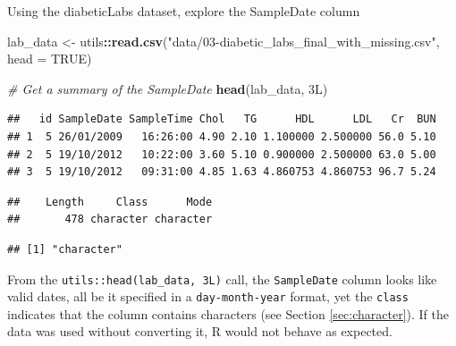 \documentclass[
]{book}
\newenvironment{Shaded}{\begin{snugshade}}{\end{snugshade}}
\newcommand{\AttributeTok}[1]{\textcolor[rgb]{0.13,0.29,0.53}{#1}}
\newcommand{\CommentTok}[1]{\textcolor[rgb]{0.56,0.35,0.01}{\textit{#1}}}
\newcommand{\ConstantTok}[1]{\textcolor[rgb]{0.56,0.35,0.01}{#1}}
\newcommand{\DataTypeTok}[1]{\textcolor[rgb]{0.13,0.29,0.53}{#1}}
\newcommand{\DecValTok}[1]{\textcolor[rgb]{0.00,0.00,0.81}{#1}}
\newcommand{\FunctionTok}[1]{\textcolor[rgb]{0.13,0.29,0.53}{\textbf{#1}}}
\newcommand{\NormalTok}[1]{#1}
\newcommand{\OtherTok}[1]{\textcolor[rgb]{0.56,0.35,0.01}{#1}}
\newcommand{\SpecialCharTok}[1]{\textcolor[rgb]{0.81,0.36,0.00}{\textbf{#1}}}
\newcommand{\StringTok}[1]{\textcolor[rgb]{0.31,0.60,0.02}{#1}}
\begin{document}
Using the diabeticLabs dataset, explore the SampleDate column

\begin{Shaded}
\begin{Highlighting}[]
\NormalTok{lab\_data }\OtherTok{\textless{}{-}}\NormalTok{ utils}\SpecialCharTok{::}\FunctionTok{read.csv}\NormalTok{(}\StringTok{"data/03{-}diabetic\_labs\_final\_with\_missing.csv"}\NormalTok{, }\AttributeTok{head =} \ConstantTok{TRUE}\NormalTok{)}

\CommentTok{\# Get a summary of the SampleDate }
\FunctionTok{head}\NormalTok{(lab\_data, }\DecValTok{3}\DataTypeTok{L}\NormalTok{)}
\end{Highlighting}
\end{Shaded}

\begin{verbatim}
##   id SampleDate SampleTime Chol   TG      HDL      LDL   Cr  BUN
## 1  5 26/01/2009   16:26:00 4.90 2.10 1.100000 2.500000 56.0 5.10
## 2  5 19/10/2012   10:22:00 3.60 5.10 0.900000 2.500000 63.0 5.00
## 3  5 19/10/2012   09:31:00 4.85 1.63 4.860753 4.860753 96.7 5.24
\end{verbatim}

\begin{Shaded}
\end{Shaded}

\begin{verbatim}
##    Length     Class      Mode 
##       478 character character
\end{verbatim}

\begin{Shaded}
\end{Shaded}

\begin{verbatim}
## [1] "character"
\end{verbatim}

From the \texttt{utils::head(lab\_data,\ 3L)} call, the \texttt{SampleDate} column looks like valid dates, all be it specified in a \texttt{day-month-year} format, yet the \texttt{class} indicates that the column contains characters (see Section \ref{sec:character}). If the data was used without converting it, R would not behave as expected.
\end{document}
